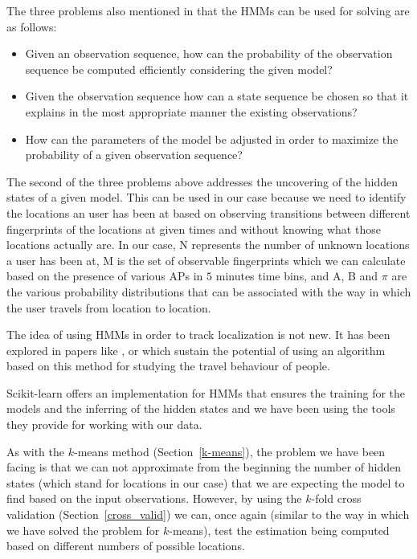 The three problems also mentioned in \cite{18626} that the HMMs can be used for
solving are as follows:
\begin{itemize}
  \item Given an observation sequence, how can the probability of the
  observation sequence be computed efficiently considering the given model?
  \item Given the observation sequence how can a state sequence be chosen so
  that it explains in the most appropriate manner the existing observations?
  \item How can the parameters of the model be adjusted in order to maximize the
  probability of a given observation sequence?
\end{itemize}

The second of the three problems above addresses the uncovering of the hidden
states of a given model. This can be used in our case because we need to
identify the locations an user has been at based on observing transitions
between different fingerprints of the locations at given times and without
knowing what those locations actually are. In our case, N represents the number
of unknown locations a user has been at, M is the set of observable fingerprints
which we can calculate based on the presence of various APs in $5$ minutes time
bins, and A, B and $\pi$ are the various probability distributions that can be
associated with the way in which the user travels from location to location.

The idea of using HMMs in order to track localization is not new. It has been
explored in papers like \cite{el2013indoor}, \cite{inatomi2013hidden} or
\cite{morelli2007hidden} which sustain the potential of using an algorithm based
on this method for studying the travel behaviour of people.

Scikit-learn \cite{Scikit} offers an implementation for HMMs that ensures the
training for the models and the inferring of the hidden states and we have been
using the tools they provide for working with our data.

As with the $k$-means method (Section~\ref{k-means}), the problem we have been
facing is that we can not approximate from the beginning the number of hidden
states (which stand for locations in our case) that we are expecting the model
to find based on the input observations. However, by using the $k$-fold cross
validation (Section~\ref{cross_valid}) we can, once again (similar to the way in
which we have solved the problem for $k$-means), test the estimation being
computed based on different numbers of possible locations.

